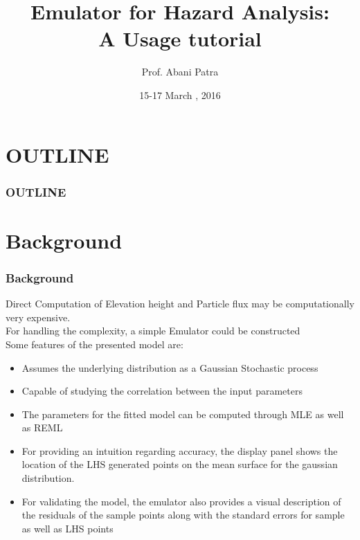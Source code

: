 \documentclass[10pt]{beamer}
\begin{document}
\title {\bfseries{\sc Emulator for Hazard Analysis:\\ A Usage tutorial}}
\author {Prof. Abani Patra}
\date{\small 15-17 March , 2016} 
\begin{frame}
\titlepage
\end{frame}
\section*{OUTLINE}
\begin{frame}
\frametitle{OUTLINE}  
\tableofcontents
\end{frame}

\section{Background}
\begin{frame}
\frametitle{Background}
Direct Computation of Elevation height and Particle flux may be computationally very expensive.\\
\vspace{1mm}
For handling the complexity, a simple Emulator could be constructed \\
Some features of the presented model are:\\
\begin{itemize} 
    \item  Assumes the underlying distribution as a Gaussian Stochastic process
    \item Capable of studying the correlation between the input parameters
    \item The parameters for the fitted model can be computed through MLE as well as REML
    \item For providing an intuition regarding accuracy, the display panel shows the location of the LHS generated points on the mean surface for the gaussian distribution.
    \item For validating the model, the emulator also provides a visual description of the residuals of the sample points along with the standard errors for sample as well as LHS points

\end{itemize}
\end{frame}
\end{document}
